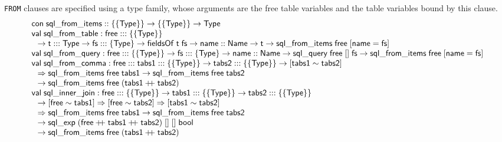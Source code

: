 \documentclass{article}
\newcommand{\mt}[1]{\mathsf{#1}}
\newcommand{\rc}{+ \hspace{-.075in} + \;}
\begin{document}
\texttt{FROM} clauses are specified using a type family, whose arguments are the free table variables and the table variables bound by this clause.
$$\begin{array}{l}
  \mt{con} \; \mt{sql\_from\_items} :: \{\{\mt{Type}\}\} \to \{\{\mt{Type}\}\} \to \mt{Type} \\
  \mt{val} \; \mt{sql\_from\_table} : \mt{free} ::: \{\{\mt{Type}\}\} \\
  \hspace{.1in} \to \mt{t} ::: \mt{Type} \to \mt{fs} ::: \{\mt{Type}\} \to \mt{fieldsOf} \; \mt{t} \; \mt{fs} \to \mt{name} :: \mt{Name} \to \mt{t} \to \mt{sql\_from\_items} \; \mt{free} \; [\mt{name} = \mt{fs}] \\
  \mt{val} \; \mt{sql\_from\_query} : \mt{free} ::: \{\{\mt{Type}\}\} \to \mt{fs} ::: \{\mt{Type}\} \to \mt{name} :: \mt{Name} \to \mt{sql\_query} \; \mt{free} \; [] \; \mt{fs} \to \mt{sql\_from\_items} \; \mt{free} \; [\mt{name} = \mt{fs}] \\
  \mt{val} \; \mt{sql\_from\_comma} : \mt{free} ::: \mt{tabs1} ::: \{\{\mt{Type}\}\} \to \mt{tabs2} ::: \{\{\mt{Type}\}\} \to [\mt{tabs1} \sim \mt{tabs2}] \\
  \hspace{.1in} \Rightarrow \mt{sql\_from\_items} \; \mt{free} \; \mt{tabs1} \to \mt{sql\_from\_items} \; \mt{free} \; \mt{tabs2} \\
  \hspace{.1in} \to \mt{sql\_from\_items} \; \mt{free} \; (\mt{tabs1} \rc \mt{tabs2}) \\
  \mt{val} \; \mt{sql\_inner\_join} : \mt{free} ::: \{\{\mt{Type}\}\} \to \mt{tabs1} ::: \{\{\mt{Type}\}\} \to \mt{tabs2} ::: \{\{\mt{Type}\}\} \\
  \hspace{.1in} \to [\mt{free} \sim \mt{tabs1}] \Rightarrow [\mt{free} \sim \mt{tabs2}] \Rightarrow [\mt{tabs1} \sim \mt{tabs2}] \\
  \hspace{.1in} \Rightarrow \mt{sql\_from\_items} \; \mt{free} \; \mt{tabs1} \to \mt{sql\_from\_items} \; \mt{free} \; \mt{tabs2} \\
  \hspace{.1in} \to \mt{sql\_exp} \; (\mt{free} \rc \mt{tabs1} \rc \mt{tabs2}) \; [] \; [] \; \mt{bool} \\
  \hspace{.1in} \to \mt{sql\_from\_items} \; \mt{free} \; (\mt{tabs1} \rc \mt{tabs2})
\end{array}$$
\end{document}
